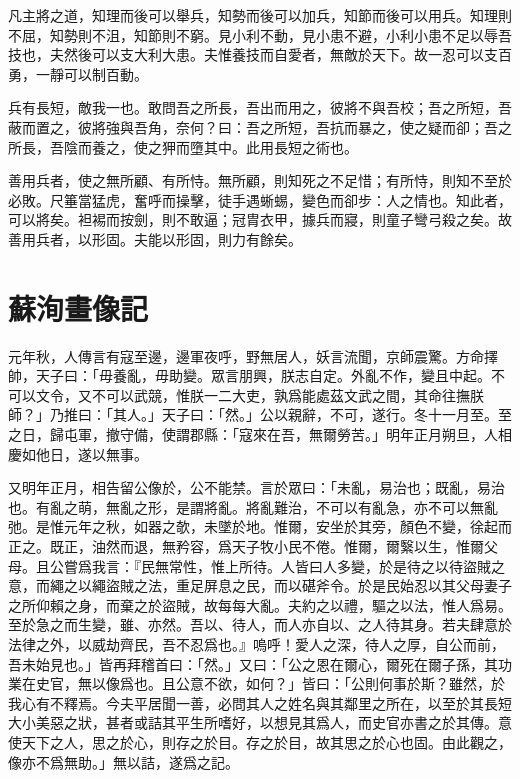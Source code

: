 凡主將之道，知理而後可以舉兵，知勢而後可以加兵，知節而後可以用兵。知理則不屈，知勢則不沮，知節則不窮。見小利不動，見小患不避，小利小患不足以辱吾技也，夫然後可以支大利大患。夫惟養技而自愛者，無敵於天下。故一忍可以支百勇，一靜可以制百動。

兵有長短，敵我一也。敢問吾之所長，吾出而用之，彼將不與吾校；吾之所短，吾蔽而置之，彼將強與吾角，奈何？曰：吾之所短，吾抗而暴之，使之疑而卻；吾之所長，吾陰而養之，使之狎而墮其中。此用長短之術也。

善用兵者，使之無所顧、有所恃。無所顧，則知死之不足惜；有所恃，則知不至於必敗。尺箠當猛虎，奮呼而操擊，徒手遇蜥蜴，變色而卻步：人之情也。知此者，可以將矣。袒裼而按劍，則不敢逼；冠胄衣甲，據兵而寢，則童子彎弓殺之矣。故善用兵者，以形固。夫能以形固，則力有餘矣。

\section[張益州畫像記\quad{\small 蘇洵}]{{\normalsize 蘇洵}\quad{}畫像記}
元年秋，人傳言有寇至{邊}，邊軍夜呼，野無居人，妖言流聞，京師震驚。方命擇帥，天子曰：「毋養亂，毋助變。眾言朋興，朕志自定。外亂不{作}，變且中起。不可以文令，又不可以武競，惟朕一二大吏，孰爲能處茲文武之間，其命往撫朕師？」乃推曰：「其人。」天子曰：「然。」公以親辭，不可，遂行。冬十一月至。至之日，歸屯軍，撤守備，使謂郡縣：「寇來在吾，無爾勞苦。」明年正月朔旦，人相慶如他日，遂以無事。%

又明年正月，相告留公像於，公不能禁。言於眾曰：「未亂，易治也；既亂，易治也。有亂之萌，無亂之形，是謂將亂。將亂難治，不可以有亂急，亦不可以無亂弛。是惟元年之秋，如器之欹，未墜於地。惟爾，安坐於其旁，顏色不變，徐起而正之。既正，油然而退，無矜容，爲天子牧小民不倦。惟爾，爾繄以生，惟爾父母。且公嘗爲我言：『民無常性，惟上所待。人皆曰人多變，於是待之以待盜賊之意，而繩之以繩盜賊之法，重足屏息之民，而以碪斧令。於是民始忍以其父母妻子之所仰賴之身，而棄之於盜賊，故每每大亂。夫約之以禮，驅之以法，惟人爲易。至於急之而生變，雖、亦然。吾以、待人，而人亦自以、之人待其身。若夫肆意於法律之外，以威劫{齊}民，吾不忍爲也。』嗚呼！愛人之深，待人之厚，自公而前，吾未始見也。」皆再拜稽首曰：「然。」又曰：「公之恩在爾心，爾死在爾子孫，其功業在史官，無以像爲也。且公意不欲，如何？」皆曰：「公則何事於斯？雖然，於我心有不釋焉。今夫平居聞一善，必問其人之姓名與其鄰里之所在，以至於其長短大小美惡之狀，甚者或詰其平生所嗜好，以想見其爲人，而史官亦書之於其傳。意使天下之人，思之於心，則存之於目。存之於目，故其思之於心也固。由此觀之，像亦不爲無助。」無以詰，遂爲之記。

